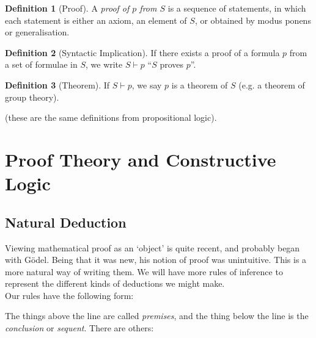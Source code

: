 \documentclass{article}
\theoremstyle{definition}
\newtheorem{definition}{Definition}
\numberwithin{definition}{section}
\newcommand{\proves}{\vdash}
\begin{document}
\begin{definition}[Proof]
A \textit{proof of $p$ from $S$} is a sequence of statements, in which each statement is either an axiom, an element of $S$, or obtained by modus ponens or generalisation. 
\end{definition}

\begin{definition}[Syntactic Implication]
If there exists a proof of a formula $p$ from a set of formulae in $S$, we write $S \proves p$ ``$S$ proves $p$''. 
\end{definition}

\begin{definition}[Theorem]
If $S \proves p$, we say $p$ is a theorem of $S$ (e.g. a theorem of group theory). 
\end{definition}
(these are the same definitions from propositional logic). 

\setcounter{section}{7}
\section{Proof Theory and Constructive Logic}
\subsection{Natural Deduction}
Viewing mathematical proof as an `object' is quite recent, and probably began with G\"odel. Being that it was new, his notion of proof was unintuitive. This is a more natural way of writing them. We will have more rules of inference to represent the different kinds of deductions we might make.\\
Our rules have the following form:\\
\begin{prooftree}
\end{prooftree}
The things above the line are called \textit{premises}, and the thing below the line is the \textit{conclusion} or \textit{sequent}. There are others:
\begin{prooftree}
\end{prooftree}

\begin{prooftree}
\end{prooftree}

\begin{prooftree}
\end{prooftree}
\end{document}
